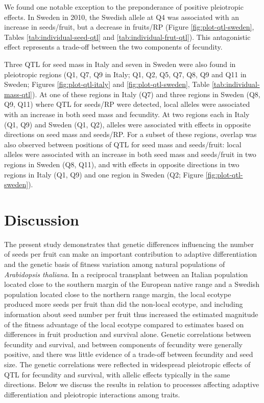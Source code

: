 \documentclass[]{article}
\begin{document}
We found one notable exception to the preponderance of positive pleiotropic effects. In Sweden in 2010, the Swedish allele at Q4 was associated with an increase in seeds/fruit, but a decrease in fruits/RP (Figure \ref{fig:plot-qtl-sweden}, Tables \ref{tab:individual-seed-qtl} and \ref{tab:individual-frut-qtl}). This antagonistic effect represents a trade-off between the two components of fecundity.

Three QTL for seed mass in Italy and seven in Sweden were also found in pleiotropic regions (Q1, Q7, Q9 in Italy; Q1, Q2, Q5, Q7, Q8, Q9 and Q11 in Sweden; Figures \ref{fig:plot-qtl-italy} and \ref{fig:plot-qtl-sweden}, Table \ref{tab:individual-mass-qtl}). At one of these regions in Italy (Q7) and three regions in Sweden (Q8, Q9, Q11) where QTL for seeds/RP were detected, local alleles were associated with an increase in both seed mass and fecundity. At two regions each in Italy (Q1, Q9) and Sweden (Q1, Q2), alleles were associated with effects in opposite directions on seed mass and seeds/RP. For a subset of these regions, overlap was also observed between positions of QTL for seed mass and seeds/fruit: local alleles were associated with an increase in both seed mass and seeds/fruit in two regions in Sweden (Q8, Q11), and with effects in opposite directions in two regions in Italy (Q1, Q9) and one region in Sweden (Q2; Figure \ref{fig:plot-qtl-sweden}).

\hypertarget{discussion}{%
\section{Discussion}\label{discussion}}

The present study demonstrates that genetic differences influencing the number of seeds per fruit can make an important contribution to adaptive differentiation and the genetic basis of fitness variation among natural populations of \emph{Arabidopsis thaliana}. In a reciprocal transplant between an Italian population located close to the southern margin of the European native range and a Swedish population located close to the northern range margin, the local ecotype produced more seeds per fruit than did the non-local ecotype, and including information about seed number per fruit thus increased the estimated magnitude of the fitness advantage of the local ecotype compared to estimates based on differences in fruit production and survival alone. Genetic correlations between fecundity and survival, and between components of fecundity were generally positive, and there was little evidence of a trade-off between fecundity and seed size. The genetic correlations were reflected in widespread pleiotropic effects of QTL for fecundity and survival, with allelic effects typically in the same directions. Below we discuss the results in relation to processes affecting adaptive differentiation and pleiotropic interactions among traits.
\end{document}
